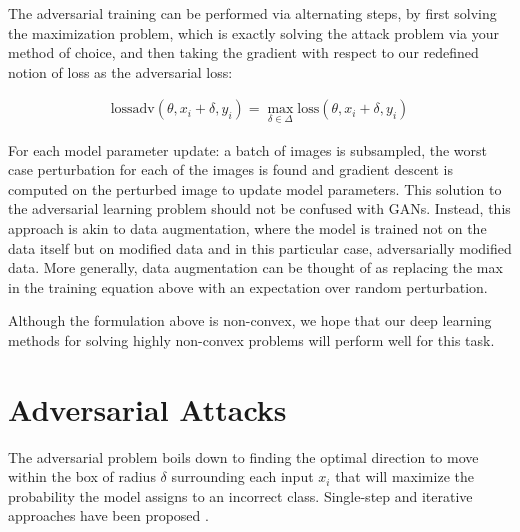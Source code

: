 \documentclass[10pt]{article}
\begin{document}
The adversarial training can be performed via alternating steps, by first solving the maximization problem, which is exactly solving the attack problem via your method of choice, and then taking the gradient with respect to our redefined notion of loss as the adversarial loss:

\begin{align*}
\text{lossadv}(\theta, x_i + \delta, y_i) =  \max_{\delta\in\Delta} \text{loss}(\theta, x_i + \delta, y_i)
\end{align*}

For each model parameter update: a batch of images is subsampled, the worst case perturbation for each of the images is found and gradient descent is computed on the perturbed image to update model parameters. This solution to the adversarial learning problem should not be confused with GANs. Instead, this approach is akin to data augmentation, where the model is trained not on the data itself but on modified data and in this particular case, adversarially modified data. More generally, data augmentation can be thought of as replacing the max in the training equation above with an expectation over random perturbation.

Although the formulation above is non-convex, we hope that our deep learning methods for solving highly non-convex problems will perform well for this task.

\section{Adversarial Attacks}

The adversarial problem boils down to finding the optimal direction to move within the box of radius $\delta$ surrounding each input $x_i$ that will maximize the probability the model assigns to an incorrect class.  Single-step and iterative approaches have been proposed \cite{Madry2017}.
\end{document}
